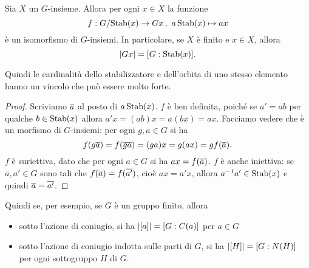 \begin{prop}\label{prop:StabilizzatoreOrbita}
Sia $X$ un $G$-insieme. Allora per ogni $x \in X$ la funzione
\[
f : {G}{/}{\operatorname{Stab}(x)} \to Gx \,,\ a\operatorname{Stab}(x)\mapsto ax
\]
è un isomorfismo di $G$-insiemi. In particolare, se $X$ è finito e $x\in X$, allora
\[\left\lvert Gx\right\rvert = [G:\operatorname{Stab}(x)] .\]
\end{prop}

Quindi le cardinalità dello stabilizzatore e dell'orbita di uno stesso elemento hanno un vincolo che può essere molto forte.

\begin{proof}
Scriviamo $\overline{a}$ al posto di $a \operatorname{Stab}(x)$.
$f$ è ben definita, poiché se $a'=ab$ per qualche $b \in \operatorname{Stab}(x)$ allora $a'x=(ab)x=a(bx)=ax$. Facciamo vedere che è un morfismo di $G$-insiemi: per ogni $g,a\in G$ si ha
\[
f(g\overline{a})=f(\overline{ga})=(ga)x=g(ax)=gf(\overline{a}) .
\]
$f$ è suriettiva, dato che per ogni $a\in G$ si ha $ax=f(\overline{a})$. $f$ è anche iniettiva: se $a,a'\in G$ sono tali che $f(\overline{a})=f(\overline{a'})$, cioè $ax=a'x$, allora $a^{-1}a'\in\operatorname{Stab}(x)$ e quindi $\overline{a}=\overline{a'}$.
\end{proof}



\begin{esem}
Quindi se, per esempio, se $G$ è un gruppo finito, allora
%
\begin{itemize}
\item sotto l'azione di coniugio, si ha $\left\lvert[a]\right\rvert=[G: C(a)]$ per $a \in G$
\item sotto l'azione di coniugio indotta sulle parti di $G$, si ha $\left\lvert[H]\right\rvert=[G: N(H)]$ per ogni sottogruppo $H$ di $G$.
\end{itemize}
\end{esem}

